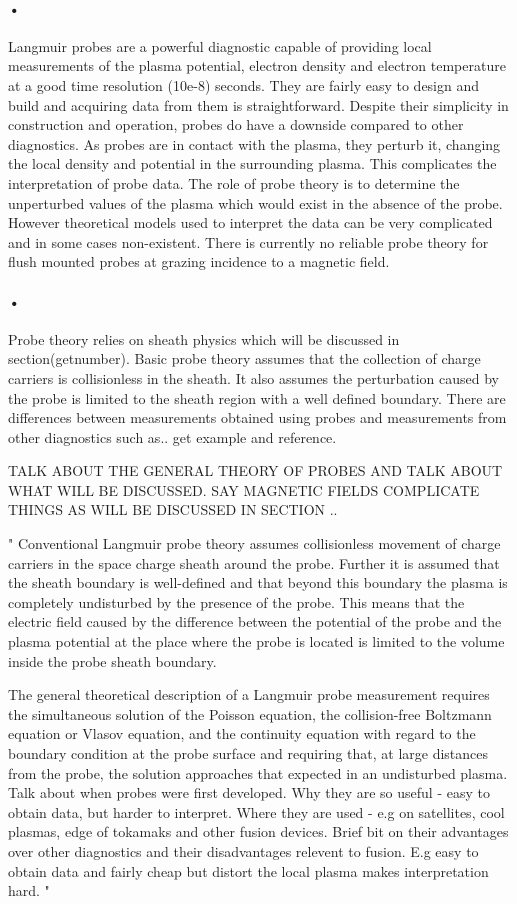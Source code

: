 \documentclass[12pt]{article}
\begin{document}
\paragraph{•}
Langmuir probes are a powerful diagnostic capable of providing local measurements of  the plasma potential, electron density and electron temperature at a good time resolution (10e-8) seconds. They are fairly easy to design and build and acquiring data from them is straightforward. Despite their simplicity in construction and operation, probes do have a downside compared to other diagnostics. As probes are in contact with the plasma, they perturb it, changing the local density and potential in the surrounding plasma. This complicates the interpretation of probe data. The role of probe theory is to determine the unperturbed values of the plasma which would exist in the absence of the probe. However theoretical models used to interpret the data can be very complicated and in some cases non-existent. There is currently no reliable probe theory for flush mounted probes at grazing incidence to a magnetic field. 
\paragraph{•}
Probe theory relies on sheath physics which will be discussed in section(getnumber). Basic probe theory assumes that the collection of charge carriers is collisionless in the sheath. It also assumes the perturbation caused by the probe is limited to the sheath region with a well defined boundary. There are differences between measurements obtained using probes and measurements from other diagnostics such as.. get example and reference.  


TALK ABOUT THE GENERAL THEORY OF PROBES AND TALK ABOUT WHAT WILL BE DISCUSSED. SAY MAGNETIC FIELDS COMPLICATE THINGS AS WILL BE DISCUSSED IN SECTION .. 

"
Conventional Langmuir probe theory assumes collisionless movement of charge carriers in the space charge sheath around the probe. Further it is assumed that the sheath boundary is well-defined and that beyond this boundary the plasma is completely undisturbed by the presence of the probe. This means that the electric field caused by the difference between the potential of the probe and the plasma potential at the place where the probe is located is limited to the volume inside the probe sheath boundary.

The general theoretical description of a Langmuir probe measurement requires the simultaneous solution of the Poisson equation, the collision-free Boltzmann equation or Vlasov equation, and the continuity equation with regard to the boundary condition at the probe surface and requiring that, at large distances from the probe, the solution approaches that expected in an undisturbed plasma.
Talk about when probes were first developed. 
Why they are so useful - easy to obtain data, but harder to interpret. 
Where they are used - e.g on satellites, cool plasmas, edge of tokamaks and other fusion devices. 
Brief bit on their advantages over other diagnostics and their disadvantages relevent to fusion. E.g easy to obtain data and fairly cheap but distort the local plasma makes interpretation hard. "
\end{document}
